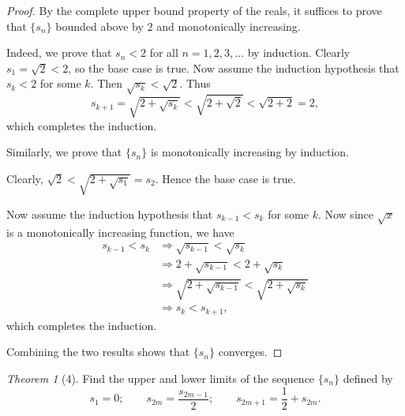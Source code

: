 \documentclass[12pt]{article}
\theoremstyle{remark}
\theoremstyle{named}
\newtheorem*{theorem}{Theorem}
\renewcommand{\implies}{\Rightarrow}
\begin{document}
\begin{proof}
    By the complete upper bound property of the reals, it suffices to prove that \(\{s_n\}\) bounded above by \(2\) and monotonically increasing.

    Indeed, we prove that \(s_n < 2\) for all \(n = 1, 2, 3, \dots\) by induction. Clearly \(s_1 = \sqrt 2 < 2\), so the base case is true. Now assume the induction hypothesis that \(s_k < 2\) for some \(k\). Then \(\sqrt{s_k} < \sqrt{2}\). Thus
    \[s_{k + 1} = \sqrt{2 + \sqrt{s_k}} < \sqrt{2 + \sqrt{2}} < \sqrt{2 + 2} = 2,\]
    which completes the induction.

    Similarly, we prove that \(\{s_n\}\) is monotonically increasing by induction. 

    Clearly, \(\sqrt 2 < \sqrt{2 + \sqrt{s_1}} = s_2\). Hence the base case is true.

    Now assume the induction hypothesis that \(s_{k - 1} < s_{k}\) for some \(k\). Now since \(\sqrt{x}\) is a monotonically increasing function, we have 
    \begin{align*}
        s_{k - 1} < s_k &\implies \sqrt{s_{k - 1}} < \sqrt{s_k} \\
        &\implies 2 + \sqrt{s_{k - 1}} < 2 + \sqrt{s_{k}} \\ 
        &\implies \sqrt{2 + \sqrt{s_{k - 1}}} < \sqrt{2 + \sqrt{s_{k}}} \\ 
        &\implies s_k < s_{k + 1},
    \end{align*} 
    which completes the induction.

    Combining the two results shows that \(\{s_n\}\) converges.
\end{proof}

\begin{theorem}[4]
    Find the upper and lower limits of the sequence \(\{s_n\}\) defined by
    \[s_1 = 0; \hspace{2em} s_{2m} = \frac{s_{2m - 1}}{2}; \hspace{2em} s_{2m + 1} = \frac{1}{2} + s_{2m}.\]
\end{theorem}
\end{document}

